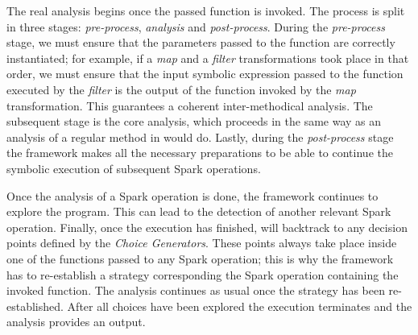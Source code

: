The real analysis begins once the passed function is invoked. The process is split in three stages: \textit{pre-process}, \textit{analysis} and \textit{post-process}. During the \textit{pre-process} stage, we must ensure that the parameters passed to the function are correctly instantiated; for example, if a \textit{map} and a \textit{filter} transformations took place in that order, we must ensure that the input symbolic expression passed to the function executed by the \textit{filter} is the output of the function invoked by the \textit{map} transformation. This guarantees a coherent inter-methodical analysis. The subsequent stage is the core analysis, which proceeds in the same way as an analysis of a regular method in \spf{} would do. Lastly, during the \textit{post-process} stage the framework makes all the necessary preparations to be able to continue the symbolic execution of subsequent Spark operations.

Once the analysis of a Spark operation is done, the framework continues to explore the program. This can lead to the detection of another relevant Spark operation. Finally, once the execution has finished, \jpf{} will backtrack to any decision points defined by the \textit{Choice Generators}. These points always take place inside one of the functions passed to any Spark operation; this is why the framework has to re-establish a strategy corresponding the Spark operation containing the invoked function. The analysis continues as usual once the strategy has been re-established. After all choices have been explored the execution terminates and the analysis provides an output.

